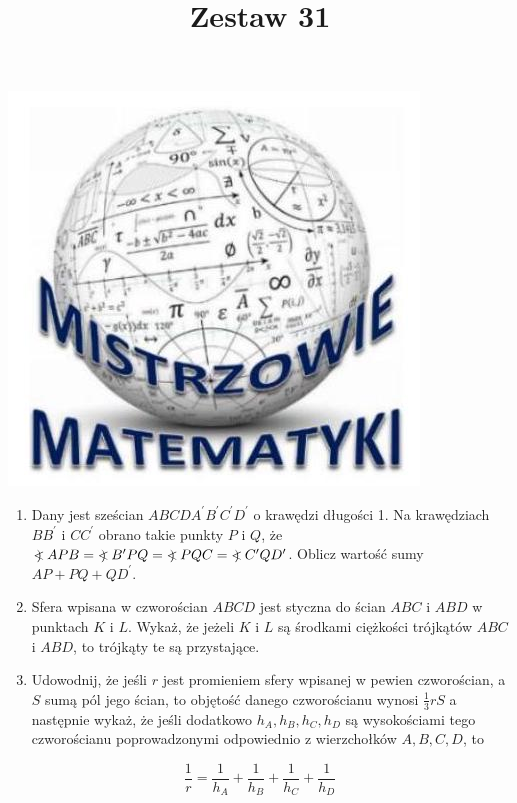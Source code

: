\documentclass[10pt]{article}
\title{Zestaw 31 }
\author{}
\date{}
\newcommand\Varangle{\mathop{{<\!\!\!\!\!\text{\small)}}\:}\nolimits}
\begin{document}
\maketitle
\begin{center}
\includegraphics[max width=\textwidth]{2024_11_21_eb513ec8beef76f87b77g-1}
\end{center}

\begin{enumerate}
  \item Dany jest sześcian \(A B C D A^{\prime} B^{\prime} C^{\prime} D^{\prime}\) o krawędzi długości 1. Na krawędziach \(B B^{\prime}\) i \(C C^{\prime}\) obrano takie punkty \(P\) i \(Q\), że \(\Varangle A P B=\Varangle B^{\prime} P Q=\Varangle P Q C=\Varangle C^{\prime} Q D^{\prime}\). Oblicz wartość sumy \(A P+P Q+Q D^{\prime}\).
  \item Sfera wpisana w czworościan \(A B C D\) jest styczna do ścian \(A B C\) i \(A B D\) w punktach \(K\) i \(L\). Wykaż, że jeżeli \(K\) i \(L\) są środkami ciężkości trójkątów \(A B C\) i \(A B D\), to trójkąty te są przystające.
  \item Udowodnij, że jeśli \(r\) jest promieniem sfery wpisanej w pewien czworościan, a \(S\) sumą pól jego ścian, to objętość danego czworościanu wynosi \(\frac{1}{3} r S\) a następnie wykaż, że jeśli dodatkowo \(h_{A}, h_{B}, h_{C}, h_{D}\) są wysokościami tego czworościanu poprowadzonymi odpowiednio z wierzchołków \(A, B, C, D\), to
\end{enumerate}

\[
\frac{1}{r}=\frac{1}{h_{A}}+\frac{1}{h_{B}}+\frac{1}{h_{C}}+\frac{1}{h_{D}}
\]
\end{document}
